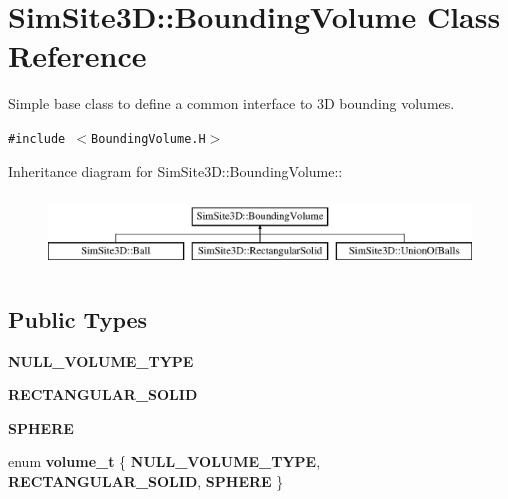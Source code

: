 \section{SimSite3D::Bounding\-Volume Class Reference}
\label{classSimSite3D_1_1BoundingVolume}
Simple base class to define a common interface to 3D bounding volumes.  


{\tt \#include $<$Bounding\-Volume.H$>$}

Inheritance diagram for SimSite3D::Bounding\-Volume::\begin{figure}[H]
\begin{center}
\leavevmode
\includegraphics[height=2cm]{classSimSite3D_1_1BoundingVolume}
\end{center}
\end{figure}
\subsection*{Public Types}
\begin{CompactItemize}
\item 
\textbf{NULL\_\-VOLUME\_\-TYPE}\label{classSimSite3D_1_1BoundingVolume_90dd526306d995889c2ba0527d0e400c206c9d67d4ddcabdc42058538e90f223}

\item 
\textbf{RECTANGULAR\_\-SOLID}\label{classSimSite3D_1_1BoundingVolume_90dd526306d995889c2ba0527d0e400c978442c972efd3f68accee6a0a9f172c}

\item 
\textbf{SPHERE}\label{classSimSite3D_1_1BoundingVolume_90dd526306d995889c2ba0527d0e400cc10cb5a6a2c07cc74764081b2c34829d}

\item 
enum \textbf{volume\_\-t} \{ \textbf{NULL\_\-VOLUME\_\-TYPE}, 
\textbf{RECTANGULAR\_\-SOLID}, 
\textbf{SPHERE}
 \}
\end{CompactItemize}

